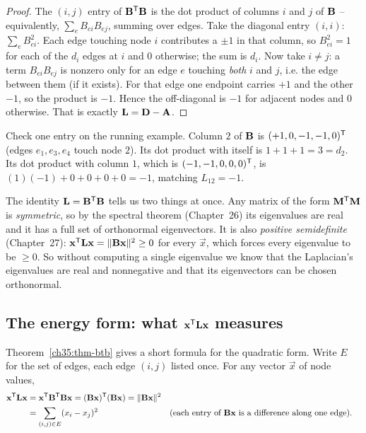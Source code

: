 \begin{proof}
The $(i,j)$ entry of $\mathbf{B}^{\mathsf{T}} \mathbf{B}$ is the dot product of columns $i$ and $j$ of
$\mathbf{B}$ -- equivalently, $\sum_e B_{ei}B_{ej}$, summing over edges. Take the diagonal
entry $(i,i)$: $\sum_e B_{ei}^2$. Each edge touching node $i$ contributes a $\pm 1$ in that
column, so $B_{ei}^2 = 1$ for each of the $d_i$ edges at $i$ and $0$ otherwise; the sum is
$d_i$. Now take $i \ne j$: a term $B_{ei}B_{ej}$ is nonzero only for an edge $e$ touching
\emph{both} $i$ and $j$, i.e. the edge between them (if it exists). For that edge one
endpoint carries $+1$ and the other $-1$, so the product is $-1$. Hence the off-diagonal is
$-1$ for adjacent nodes and $0$ otherwise. That is exactly $\mathbf{L} = \mathbf{D}-\mathbf{A}$.
\end{proof}

Check one entry on the running example. Column $2$ of $\mathbf{B}$
is $(+1,0,-1,-1,0)^{\mathsf{T}}$ (edges $e_1,e_3,e_4$ touch node $2$). Its dot product with itself is
$1+1+1 = 3 = d_2$. Its dot product with column $1$, which is $(-1,-1,0,0,0)^{\mathsf{T}}$, is
$(1)(-1) + 0 + 0 + 0 + 0 = -1$, matching $L_{12} = -1$.

\begin{aestheticbox}
The identity $\mathbf{L} = \mathbf{B}^{\mathsf{T}}\mathbf{B}$ tells us two things at once. Any matrix of the
form $\mathbf{M}^{\mathsf{T}}\mathbf{M}$ is \emph{symmetric}, so by the spectral theorem (Chapter~26) its
eigenvalues are real and it has a full set of orthonormal eigenvectors. It is also
\emph{positive semidefinite} (Chapter~27): $\mathbf{x}^{\mathsf{T}}\mathbf{L}\mathbf{x} = \lVert\mathbf{B}\mathbf{x}\rVert^2
\ge 0$ for every $\vec x$, which forces every eigenvalue to be $\ge 0$. So without computing
a single eigenvalue we know that the Laplacian's eigenvalues are real and nonnegative and
that its eigenvectors can be chosen orthonormal.
\end{aestheticbox}

\subsection{The energy form: what $\mathbf{x}^{\mathsf{T}} \mathbf{L}\mathbf{x}$ measures}

Theorem~\ref{ch35:thm-btb} gives a short formula for the quadratic form. Write $E$ for the
set of edges, each edge $(i,j)$ listed once. For any vector $\vec{x}$ of node values,
\begin{align*}
\mathbf{x}^{\mathsf{T}} \mathbf{L}\mathbf{x}
&= \mathbf{x}^{\mathsf{T}} \mathbf{B}^{\mathsf{T}} \mathbf{B}\mathbf{x}
= (\mathbf{B}\mathbf{x})^{\mathsf{T}}(\mathbf{B}\mathbf{x})
= \lVert\mathbf{B}\mathbf{x}\rVert^2\\
&= \sum_{(i,j)\in E} (x_i - x_j)^2
&&\text{(each entry of $\mathbf{B}\mathbf{x}$ is a difference along one edge).}
\end{align*}

